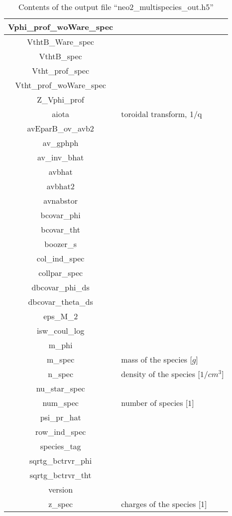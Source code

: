 \begin{table}[h]
\begin{tabular}{|c|l|}
\hline
Vphi\_prof\_woWare\_spec & \\
\hline
VthtB\_Ware\_spec & \\
\hline
VthtB\_spec & \\
\hline
Vtht\_prof\_spec & \\
\hline
Vtht\_prof\_woWare\_spec & \\
\hline
Z\_Vphi\_prof & \\
\hline
aiota & toroidal transform, 1/q \\
\hline
avEparB\_ov\_avb2 & \\
\hline
av\_gphph & \\
\hline
av\_inv\_bhat & \\
\hline
avbhat & \\
\hline
avbhat2 & \\
\hline
avnabstor & \\
\hline
bcovar\_phi & \\
\hline
bcovar\_tht & \\
\hline
boozer\_s & \\
\hline
col\_ind\_spec & \\
\hline
collpar\_spec & \\
\hline
dbcovar\_phi\_ds & \\
\hline
dbcovar\_theta\_ds & \\
\hline
eps\_M\_2 & \\
\hline
isw\_coul\_log & \\
\hline
m\_phi & \\
\hline
m\_spec & mass of the species [$g$] \\
\hline
n\_spec & density of the species [$1/cm^3$] \\
\hline
nu\_star\_spec & \\
\hline
num\_spec & number of species [$1$] \\
\hline
psi\_pr\_hat & \\
\hline
row\_ind\_spec & \\
\hline
species\_tag & \\
\hline
sqrtg\_bctrvr\_phi & \\
\hline
sqrtg\_bctrvr\_tht & \\
\hline
version & \\
\hline
z\_spec & charges of the species [1]

\end{tabular}
\caption{Contents of the output file ``neo2\_multispecies\_out.h5''}
\end{table}


